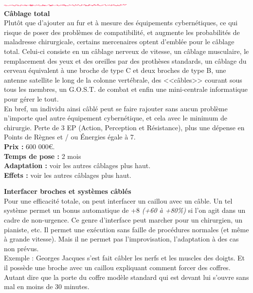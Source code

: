 \documentclass[11pt,twoside,a4paper]{article}
\def\barreCyberAgeHalf{\includegraphics[width=0.50\textwidth]{img/Filet_CA.png}}
\begin{document}
\begin{multicols*}{2}
\barreCyberAgeHalf ~\\

\textbf{C{\^a}blage total}~\\
Plut{\^o}t que d'ajouter au fur et {\`a} mesure des {\'e}quipements cybern{\'e}tiques, ce qui risque de poser des probl{\`e}mes de compatibilit{\'e}, et augmente les probabilit{\'e}s de maladresse chirurgicale, certains mercenaires optent d'embl{\'e}e pour le c{\^a}blage total. Celui-ci consiste en un c{\^a}blage nerveux de vitesse, un c{\^a}blage musculaire, le remplacement des yeux et des oreilles par des proth{\`e}ses standards, un c{\^a}blage du cerveau {\'e}quivalent {\`a} une broche de type C et deux broches de type B, une antenne satellite le long de la colonne vert{\'e}brale, des <<c{\^a}bles>> courant sous tous les membres, un G.O.S.T. de combat et enfin une mini-centrale informatique pour g{\'e}rer le tout. ~\\
En bref, un individu ainsi c{\^a}bl{\'e} peut se faire rajouter sans aucun probl{\`e}me n'importe quel autre {\'e}quipement cybern{\'e}tique, et cela avec le minimum de chirurgie. Perte de 3 EP (Action, Perception et R{\'e}sistance), plus une d{\'e}pense en Points de R{\`e}gnes et / ou {\'E}nergies {\'e}gale {\`a} 7. ~\\
{\small 
	\textbf{Prix : }600 000\euro . ~\\
	\textbf{Temps de pose : }2 mois~\\
	\textbf{Adaptation : }voir les autres c{\^a}blages plus haut. ~\\
	\textbf{Effets : }voir les autres c{\^a}blages plus haut. ~\\
} %

\columnbreak

\textbf{Interfacer broches et syst{\`e}mes c{\^a}bl{\'e}s}~\\
Pour une efficacit{\'e} totale, on peut interfacer un caillou avec un c{\^a}ble. Un tel syst{\`e}me permet un bonus automatique de +8 \emph{(+60 {\`a} +80\%)} si l'on agit dans un cadre de non-urgence. Ce genre d'interface peut marcher pour un chirurgien, un pianiste, etc. Il permet une ex{\'e}cution sans faille de proc{\'e}dures normales (et m{\^e}me {\`a} grande vitesse). Mais il ne permet pas l'improvisation, l'adaptation {\`a} des cas non pr{\'e}vus. ~\\
Exemple : Georges Jacques s'est fait c{\^a}bler les nerfs et les muscles des doigts. Et il poss{\`e}de une broche avec un caillou expliquant comment forcer des coffres. Autant dire que la porte du coffre mod{\`e}le standard qui est devant lui s'ouvre sans mal en moins de 30 minutes. %


\end{multicols*}
\end{document}
